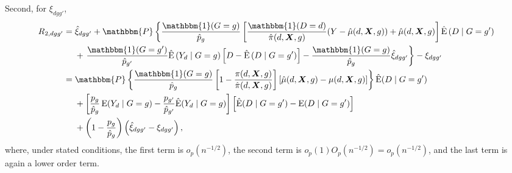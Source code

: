 \documentclass[12pt,a4paper]{article}
\newcommand{\E}{\operatorname{E}}
\def\X{{\boldsymbol X}}
\def\one{\mathbbm{1}}
\def\P{\mathbbm{P}}
\begin{document}
\begin{comment}
    Dec 20, 2022 note by AY. I think the argument goes like this, but I'm not entirely sure whether this is 100\% correct, so I'll be vague in the text.
\begin{align*}
    &\phantom{{}={}} \sqrt{n}(\P_n-\P)\left[\one(G=g)\frac{\hat{p}_g-p_g}{\hat{p}_g \hat{p}_g} \xi_{dg} \right]=o_p(n^{-1/2}) \\
    &\Leftrightarrow \sqrt{n}(\P_n-\P)\left[\one(G=g)\frac{\hat{p}_g-p_g}{\hat{p}_g} \right] =o_p(n^{-1/2} \\
    &\Leftrightarrow \left\| \one(G=g) \left( 1-\frac{p_g}{\hat{p}_g} \right) \right\|^2 =o_p(1) \\
    &\Leftrightarrow \left( 1-\frac{p_g}{\hat{p}_g} \right) \left\| \one(G=g) \right\|^2=o_p(1),
\end{align*}
which is guaranteed by the weak law of large numbers. Note that the last step holds because $\left( 1-\frac{p_g}{\hat{p}_g} \right)$ is a "constant". Otherwise, we can't directly use LLN. Instead, we need to use a bounding assumption for $\one(G=g)$. This is why I think we don't need a bounding assumption for $\left\{ \frac{\one(D=d)}{\pi(d, \X,g)} [Y-\mu(d,\X,g)] + \mu(d,\X,g) \right\}$. 
\end{comment}


Second, for $\xi_{dgg'}$,
\begin{align*}
    R_{2,dgg'} &= \hat{\xi}_{dgg'}+\P \left\{\frac{\one(G=g)}{\hat{p}_g}  \left[\frac{\one(D=d)}{\hat{\pi}(d,\X,g)}(Y-\hat{\mu}(d,\X,g)) + \hat{\mu}(d,\X,g) \right] \hat{\E} \left(D \mid G=g' \right) \right. \\
    &\phantom{{}={}} + \left. \frac{\one(G=g')}{\hat{p}_{g'}} \hat{\E} \left(Y_d \mid G=g \right) \left[D - \hat{\E} \left(D \mid G=g' \right) \right] - \frac{\one(G=g)}{\hat{p}_g} \hat{\xi}_{dgg'} \right\} - \xi_{dgg'} \\
    &= \P \left\{ \frac{\one(G=g)}{\hat{p}_g} \left[1-\frac{\pi(d,\X,g)}{\hat{\pi}(d,\X,g)} \right]\left[\hat{\mu}(d,\X,g)-\mu(d,\X,g)\right] \right\} \hat{\E}(D\mid G=g') \\
    &\phantom{{}={}} + \left[\frac{p_g}{\hat{p}_g} \E(Y_d \mid G=g) - \frac{p_{g'}}{\hat{p}_{g'}}\hat{\E}(Y_d \mid G=g) \right] \left[\hat{\E}(D \mid G=g') - \E(D\mid G=g') \right] \\
    &\phantom{{}={}} + \left(1-\frac{p_g}{\hat{p}_g}\right) \left(\hat{\xi}_{dgg'}-\xi_{dgg'} \right),
\end{align*}
where, under stated conditions, the first term is $o_p(n^{-1/2})$, the second term is $o_p(1)O_p(n^{-1/2})=o_p(n^{-1/2})$, and the last term is again a lower order term. 
\end{document}
